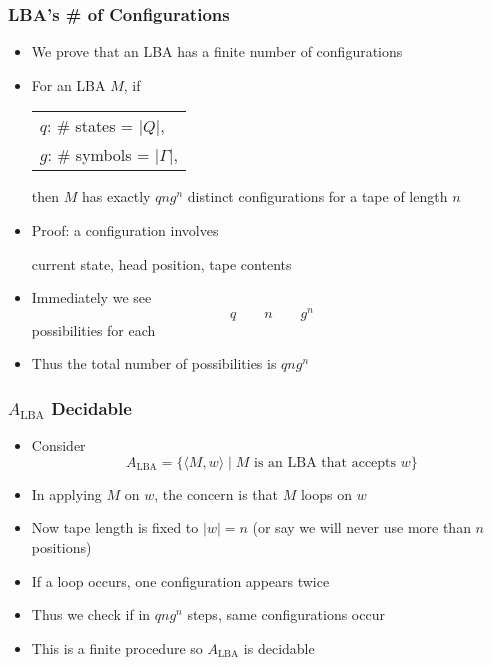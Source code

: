 \begin{frame}[allowframebreaks]
\frametitle{LBA's \# of Configurations}
\begin{itemize}
\item We prove that an LBA has a finite number of
  configurations
\item For an LBA $M$, if
  \begin{center}
    \begin{tabular}{l}
      $q$: \# states = $|Q|$,\\
      $g$: \# symbols = $|\Gamma|$,
    \end{tabular}
  \end{center}
  then $M$ has exactly $qng^n$ distinct
  configurations for a tape of length $n$
\item Proof: a configuration involves
  \begin{center}
    current state, head position, tape contents
  \end{center}
  \item
    Immediately we see
    \begin{equation*}
      q \qquad n \qquad g^n
    \end{equation*}
    possibilities for each
  \item Thus the total number of possibilities is $qng^n$
\end{itemize}
\end{frame}

\begin{frame}[allowframebreaks]
\frametitle{$A_{\text{LBA}}$ Decidable}
\begin{itemize}
\item Consider
  \begin{equation*}
  A_{\text{LBA}}=
\{\langle  M,w\rangle\mid M \mbox{ is an LBA that accepts } w\}
\end{equation*}
  \item In applying $M$ on $w$, the concern is that $M$
    loops on $w$
  \item Now tape length is fixed to $|w|=n$ (or say we will never
    use more than $n$ positions)
  \item If a loop occurs, one configuration 
appears twice
\item Thus we check if in $qng^n$ steps, same configurations occur
\item This is a finite procedure so $A_{\text{LBA}}$ is
  decidable
\end{itemize}
\end{frame}



